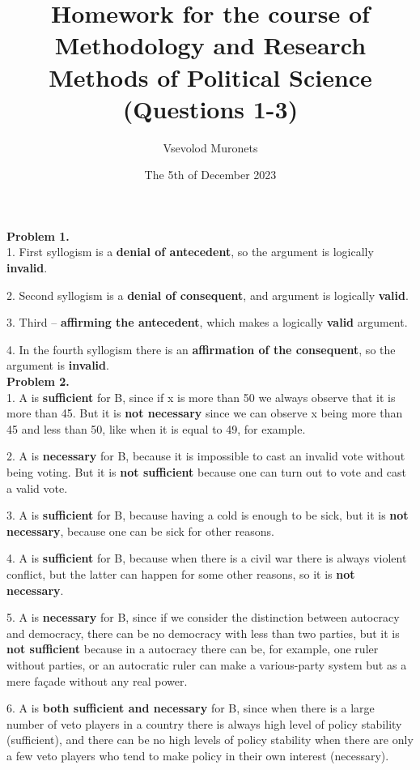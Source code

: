 \documentclass{article}
\title{Homework for the course of Methodology and Research Methods of Political Science (Questions 1-3)}
\author{Vsevolod Muronets}
\date{The 5th of December 2023}
\begin{document}
\maketitle 
\textbf{Problem  1.}
\\

1.	 First syllogism is a \textbf{denial of antecedent}, so the argument is logically \textbf{invalid}. 

2.	Second syllogism is a \textbf{denial of consequent}, and argument is logically \textbf{valid}.

3.	 Third – \textbf{affirming the antecedent}, which makes a logically \textbf{valid} argument.

4.	 In the fourth syllogism there is an \textbf{affirmation of the consequent}, so the argument is \textbf{invalid}. 
\\

\textbf{Problem 2.}
\\

1.	A is \textbf{sufficient} for B, since if x is more than 50 we always observe that it is more than 45. But it is \textbf{not necessary} since we can observe x being more than 45 and less than 50, like when it is equal to 49, for example. 

2.	A is \textbf{necessary} for B, because it is impossible to cast an invalid vote without being voting. But it is \textbf{not sufficient} because one can turn out to vote and cast a valid vote. 

3.	A is \textbf{sufficient} for B, because having a cold is enough to be sick, but it is \textbf{not necessary}, because one can be sick for other reasons.

4.	 A is \textbf{sufficient} for B, because when there is a civil war there is always violent conflict, but the latter can happen for some other reasons, so it is \textbf{not necessary}. 

5.	A is \textbf{necessary} for B, since if we consider the distinction between autocracy and democracy, there can be no democracy with less than two parties, but it is \textbf{not sufficient} because in a autocracy there can be, for example, one ruler without parties, or an autocratic ruler can make a various-party system but as a mere façade without any real power.

6.	A is \textbf{both sufficient and necessary} for B, since when there is a large number of veto players in a country there is always high level of policy stability (sufficient), and there can be no high levels of policy stability when there are only a few veto players who tend to make policy in their own interest (necessary).
\end{document}
